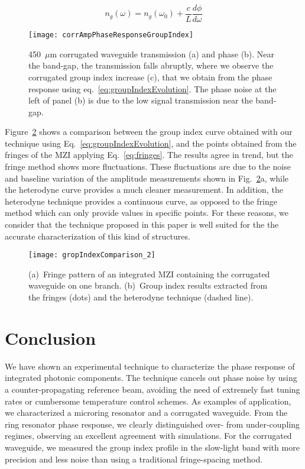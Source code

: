 \begin{equation}
  n_g (\omega)=  n_g(\omega_0) + \frac{c}{L} \frac{d\phi}{d\omega}
 \label{eq:groupIndexEvolution}
\end{equation}


\begin{figure}[htb]
  \centerline{\texttt{[image: corrAmpPhaseResponseGroupIndex]}}
  \caption{450~$\mu$m corrugated waveguide transmission (a) and phase (b). Near the band-gap, the transmission falls abruptly, where we observe the corrugated group index increase (c), that we obtain from the phase response using eq.~\ref{eq:groupIndexEvolution}.
  The phase noise at the left of panel (b) is due to the low signal transmission near the band-gap.}  
  \label{fig:corr}
\end{figure}

Figure~\ref{fig:groupIndex} shows a comparison between the group index curve obtained with our technique using Eq.~\ref{eq:groupIndexEvolution}, and the points obtained from the fringes of the MZI applying Eq.~\ref{eq:fringes}.
The results agree in trend, but the fringe method shows more fluctuations. These fluctuations are due to the noise and baseline variation of the amplitude measurements shown in Fig.~\ref{fig:groupIndex}a, while the heterodyne curve provides a much cleaner measurement. In addition, the heterodyne technique provides a continuous curve, as opposed to the fringe method which can only provide values in specific points.
For these reasons, we consider that the technique proposed in this paper is well suited for the the accurate characterization of this kind of structures.


\begin{figure}[htb]
  \centering
  \texttt{[image: gropIndexComparison\_2]}
  \caption{(a)~Fringe pattern of an integrated MZI containing the corrugated waveguide on one branch. (b)~Group index results extracted from the fringes (dots) and the heterodyne technique (dashed line).}
  \label{fig:groupIndex}
\end{figure}



\section{Conclusion}
We have shown an experimental technique to characterize the phase response of integrated photonic components.
The technique cancels out phase noise by using a counter-propagating reference beam, avoiding the need of extremely fast tuning rates or cumbersome temperature control schemes.
As examples of application, we characterized a microring resonator and a corrugated waveguide.
From the ring resonator phase response, we clearly distinguished over- from under-coupling regimes, observing an excellent agreement with simulations.
For the corrugated waveguide, we measured the group index profile in the slow-light band with more precision and less noise than using a traditional fringe-spacing method.




